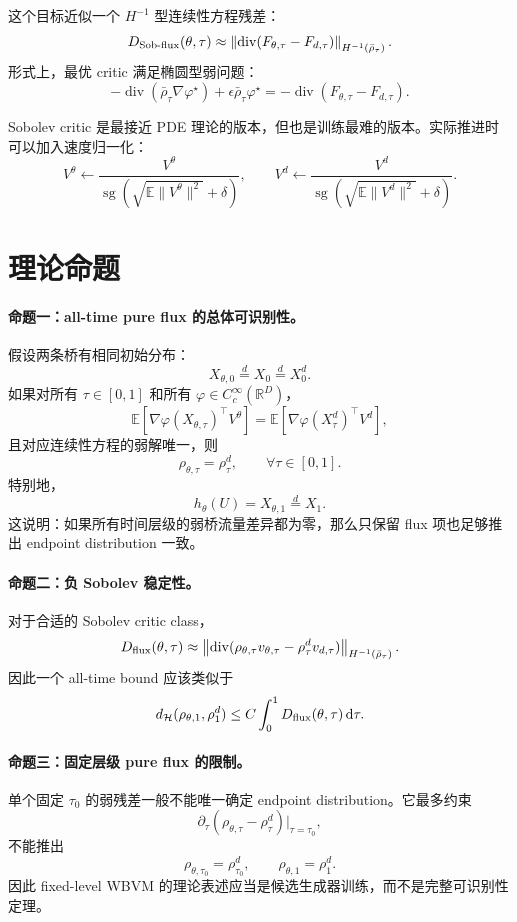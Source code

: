 \documentclass[UTF8,11pt]{ctexart}
\newcommand{\E}{\mathbb{E}}
\newcommand{\R}{\mathbb{R}}
\newcommand{\cH}{\mathcal{H}}
\newcommand{\dd}{\,\mathrm d}
\begin{document}
这个目标近似一个 \(H^{-1}\) 型连续性方程残差：
\[
D_{\rm Sob\text{-}flux}(\theta,\tau)
\approx
\left\|
\operatorname{div}
(F_{\theta,\tau}-F_{d,\tau})
\right\|_{H^{-1}(\bar\rho_\tau)}.
\]
形式上，最优 critic 满足椭圆型弱问题：
\[
-
\operatorname{div}(\bar\rho_\tau\nabla\varphi^\star)
+
\epsilon\bar\rho_\tau\varphi^\star
=
-
\operatorname{div}(F_{\theta,\tau}-F_{d,\tau}).
\]

Sobolev critic 是最接近 PDE 理论的版本，但也是训练最难的版本。实际推进时可以加入速度归一化：
\[
V^\theta
\leftarrow
\frac{V^\theta}
{\operatorname{sg}(\sqrt{\E\|V^\theta\|^2}+\delta)},
\qquad
V^d
\leftarrow
\frac{V^d}
{\operatorname{sg}(\sqrt{\E\|V^d\|^2}+\delta)}.
\]

\section{理论命题}

\paragraph{命题一：all-time pure flux 的总体可识别性。}
假设两条桥有相同初始分布：
\[
X_{\theta,0}\overset d=X_0\overset d=X_0^d.
\]
如果对所有 \(\tau\in[0,1]\) 和所有 \(\varphi\in C_c^\infty(\R^D)\)，
\[
\E[\nabla\varphi(X_{\theta,\tau})^\top V^\theta]
=
\E[\nabla\varphi(X_\tau^d)^\top V^d],
\]
且对应连续性方程的弱解唯一，则
\[
\rho_{\theta,\tau}=\rho_\tau^d,\qquad \forall \tau\in[0,1].
\]
特别地，
\[
h_\theta(U)=X_{\theta,1}\overset d=X_1.
\]
这说明：如果所有时间层级的弱桥流量差异都为零，那么只保留 flux 项也足够推出 endpoint distribution 一致。

\paragraph{命题二：负 Sobolev 稳定性。}
对于合适的 Sobolev critic class，
\[
D_{\rm flux}(\theta,\tau)
\approx
\left\|
\operatorname{div}
(\rho_{\theta,\tau}v_{\theta,\tau}
-
\rho_\tau^d v_{d,\tau})
\right\|_{H^{-1}(\bar\rho_\tau)}.
\]
因此一个 all-time bound 应该类似于
\[
d_{\cH}(\rho_{\theta,1},\rho_1^d)
\le
C
\int_0^1
D_{\rm flux}(\theta,\tau)
\dd\tau.
\]

\paragraph{命题三：固定层级 pure flux 的限制。}
单个固定 \(\tau_0\) 的弱残差一般不能唯一确定 endpoint distribution。它最多约束
\[
\partial_\tau
(\rho_{\theta,\tau}-\rho_\tau^d)\big|_{\tau=\tau_0},
\]
不能推出
\[
\rho_{\theta,\tau_0}=\rho_{\tau_0}^d,
\qquad
\rho_{\theta,1}=\rho_1^d.
\]
因此 fixed-level WBVM 的理论表述应当是候选生成器训练，而不是完整可识别性定理。
\end{document}
